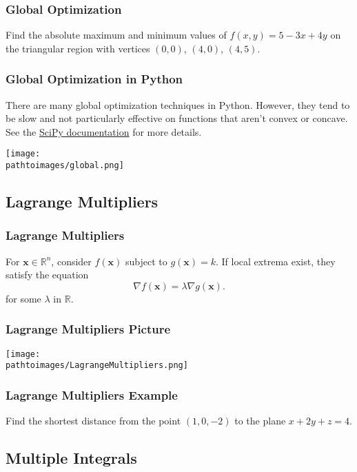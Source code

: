 \documentclass{beamer}
\newcommand{\pathtoimages}{/Users/charlesrambo/Desktop/Bootcamp24/Images}
\begin{document}
\begin{frame}[t]
\frametitle{Global Optimization}
\begin{Example}
Find the absolute maximum and minimum values of $f(x, y) = 5 - 3x + 4y$ on the triangular region with vertices $(0, 0)$, $(4, 0)$, $(4, 5)$.
\end{Example}
\end{frame}

\begin{frame}
\frametitle{Global Optimization in Python}
\tiny
There are many global optimization techniques in Python. However, they tend to be slow and not particularly effective on functions that aren't convex or concave. See the \href{https://docs.scipy.org/doc/scipy/reference/optimize.html}{SciPy documentation} for more details. 
\begin{center}
\texttt{[image: \\pathtoimages/global.png]}
\end{center}
\end{frame}

\subsection{Lagrange Multipliers}

\begin{frame}
\frametitle{Lagrange Multipliers}
For ${\boldsymbol x}\in \mathbb{R}^n$, consider $f({\boldsymbol x})$ subject to $g({\boldsymbol x}) = k$. If local extrema exist, they satisfy the equation
$$
\nabla f({\boldsymbol x}) = \lambda \nabla g({\boldsymbol x}).
$$
for some $\lambda$ in $\mathbb{R}$.
\end{frame}


\begin{frame}
\frametitle{Lagrange Multipliers Picture}
\begin{center}
\texttt{[image: \\pathtoimages/LagrangeMultipliers.png]}
\end{center}
\end{frame}

\begin{frame}[t]
\frametitle{Lagrange Multipliers Example}
\begin{Example}
Find the shortest distance from the point $(1, 0, -2)$ to the plane $x + 2y + z = 4$.
\end{Example}
\end{frame}

\subsection{Multiple Integrals}
\end{document}
